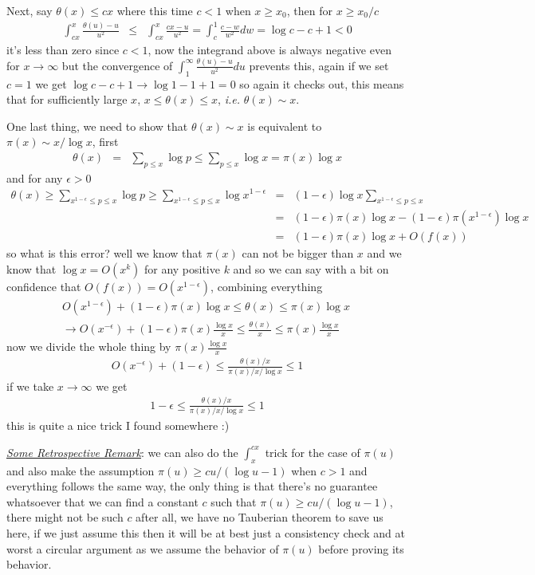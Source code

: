 \documentclass[aps,preprint,preprintnumbers,nofootinbib,showpacs,prd]{revtex4-1}
\newcommand{\ie}{{\it i.e.} }
\newcommand{\nbea}{\begin{eqnarray*}}
\newcommand{\neea}{\end{eqnarray*}}
\begin{document}
Next, say $\theta(x) \le cx$ where this time $c<1$ when $x \ge x_0$, then for $x\ge x_0/c$
%
\nbea
\int_{cx}^x \frac{\theta(u)-u}{u^2} & \le & \int_{cx}^x \frac{cx-u}{u^2} = \int_c^{1} \frac{c - w}{w^2}dw = \log c - c + 1 < 0
\neea
%
it's less than zero since $c < 1$, now the integrand above is always negative even for $x\to\infty$ but the convergence of $\int_1^{\infty} \frac{\theta(u) - u}{u^2}du$ prevents this, again if we set $c=1$ we get $\log c - c + 1 \to \log 1 - 1 + 1 = 0$ so again it checks out, this means that for sufficiently large $x$, $x \le \theta(x) \le x$, \ie $\theta(x)\sim x$.

One last thing, we need to show that $\theta(x) \sim x$ is equivalent to $\pi(x) \sim x/\log x$, first
%
\nbea
\theta(x) & = & \sum_{p\le x}\log p \le \sum_{p\le x}\log x = \pi(x)\log x
\neea
%
and for any $\epsilon > 0$
%
\nbea
\theta(x) \ge \sum_{x^{1-\epsilon}\le p\le x} \log p \ge \sum_{x^{1-\epsilon}\le p\le x}\log x^{1-\epsilon}  & = & (1-\epsilon) \log x \sum_{x^{1-\epsilon}\le p\le x} \\
& = & (1-\epsilon)\pi(x)\log x - (1-\epsilon)\pi(x^{1-\epsilon})\log x \\
& = & (1-\epsilon)\pi(x)\log x + O(f(x))
\neea
%
so what is this error? well we know that $\pi(x)$ can not be bigger than $x$ and we know that $\log x = O(x^k)$ for any positive $k$ and so we can say with a bit on confidence that $O(f(x)) = O(x^{1-\epsilon})$, combining everything
%
\nbea
O(x^{1-\epsilon}) + (1-\epsilon)\pi(x)\log x \le \theta(x) \le \pi(x)\log x ~ \\
\to O(x^{-\epsilon}) + (1-\epsilon)\pi(x)\frac{\log x}{x} \le \frac{\theta(x)}{x} \le \pi(x)\frac{\log x}{x}
\neea
%
now we divide the whole thing by $\pi(x)\frac{\log x}{x}$
%
\nbea
O(x^{-\epsilon}) + (1-\epsilon) \le \frac{\theta(x)/x}{\pi(x)/x/\log x} \le 1
\neea
%
if we take $x\to\infty$  we get
%
\nbea
1-\epsilon \le \frac{\theta(x)/x}{\pi(x)/x/\log x} \le 1
\neea
%
this is quite a nice trick I found somewhere :)

\underline{\textit{Some Retrospective Remark}}: we can also do the $\int_x^{cx}$ trick for the case of $\pi(u)$ and also make the assumption $\pi(u) \ge c u/(\log u - 1)$ when $c > 1$ and everything follows the same way, the only thing is that there's no guarantee whatsoever that we can find a constant $c$ such that $\pi(u) \ge c u/(\log u - 1)$, there might not be such $c$ after all, we have no Tauberian theorem to save us here, if we just assume this then it will be at best just a consistency check and at worst a circular argument as we assume the behavior of $\pi(u)$ before proving its behavior.
\end{document}
